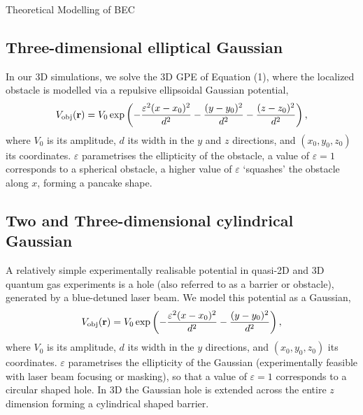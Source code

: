 \begin{chapter}{\label{cha:theoretical_model}Theoretical Modelling of BEC}
\subsection{\label{section:3dobjpotential} Three-dimensional elliptical Gaussian}
In our 3D simulations, we solve the 3D GPE of Equation (1), where the localized obstacle is modelled via a repulsive ellipsoidal Gaussian potential,
\begin{equation}
V_{\mathrm{obj}}({\bf r})=V_0 \exp \left( -\frac{\varepsilon^2(x-x_0)^2}{d^2} -\frac{(y-y_0)^2}{d^2}-\frac{(z-z_0)^2}{d^2}\right),
\label{eq:potential3D}
\end{equation}
where  $V_0$ is its amplitude, $d$ its width in the $y$ and $z$ directions, and $(x_0,y_0,z_0)$ its coordinates. $\varepsilon$ parametrises the ellipticity of the obstacle, a value of $\varepsilon=1$ corresponds to a spherical obstacle, a higher value of $\varepsilon$ `squashes' the obstacle along $x$, forming a pancake shape.

\subsection{\label{section:3dcylinderpotential} Two and Three-dimensional cylindrical Gaussian}
A relatively simple experimentally realisable potential in quasi-2D and 3D quantum gas experiments is a hole (also referred to as a barrier or obstacle), generated by a blue-detuned laser beam. We model this potential as a Gaussian,
\begin{equation}
V_{\mathrm{obj}}({\bf r})=V_0 \exp \left( -\frac{\varepsilon^2(x-x_0)^2}{d^2} -\frac{(y-y_0)^2}{d^2}\right),
\end{equation}
where  $V_0$ is its amplitude, $d$ its width in the $y$ directions, and $(x_0,y_0,z_0)$ its coordinates. $\varepsilon$ parametrises the ellipticity of the Gaussian (experimentally feasible with laser beam focusing or masking), so that a value of $\varepsilon=1$ corresponds to a circular shaped hole. In 3D the Gaussian hole is extended across the entire $z$ dimension forming a cylindrical shaped barrier.

\end{chapter}
